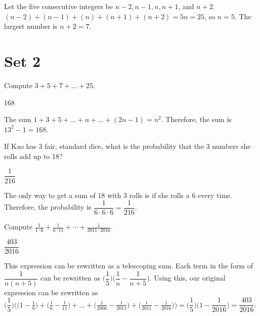 \documentclass[11pt]{article}
\begin{document}
\begin{solution}
Let the five consecutive integers be $n-2, n-1, n, n+1$, and $n+2$. $(n-2)+(n-1)+(n)+(n+1)+(n+2) = 5n = 25$, so $n=5$. The largest number is $n+2 = 7$.
\end{solution}

\newpage

\section*{Set 2}

\begin{problem}%
Compute $3+5+7+...+25$.
\end{problem}

\begin{answer}
168
\end{answer}

\begin{solution}
The sum $1+3+5+...+n+...+(2n-1) = n^2$. Therefore, the sum is $13^2-1 = 168$.  
\end{solution}


\begin{problem}%
If Kao has 3 fair, standard dice, what is the probability that the 3 numbers she rolls add up to 18?
\end{problem}

\begin{answer}
$\dfrac{1}{216}$
\end{answer}

\begin{solution}
The only way to get a sum of 18 with 3 rolls is if she rolls a 6 every time. Therefore, the probability is $\dfrac{1}{6\cdot6\cdot6} = \dfrac{1}{216}$.
\end{solution}

\begin{problem}%
Compute $\frac{1}{1\cdot 6} + \frac{1}{6\cdot 11} + \cdots + \frac{1}{2011\cdot 2016}$.
\end{problem}

\begin{answer}
$\dfrac{403}{2016}$
\end{answer}

\begin{solution}
This expression can be rewritten as a telescoping sum. Each term in the form of $\dfrac{1}{n(n+5)}$ can be rewritten as $\bigg(\dfrac{1}{5}\bigg)\bigg(\dfrac{1}{n}-\dfrac{1}{n+5}\bigg)$. Using this, our original expression can be rewritten as $\bigg(\dfrac{1}{5}\bigg)\bigg(\big(1-\frac{1}{6}\big)+\big(\frac{1}{6}-\frac{1}{11}\big)+...+\big(\frac{1}{2006}-\frac{1}{2011}\big)+\big(\frac{1}{2011}-\frac{1}{2016}\big)\bigg) = \bigg(\dfrac{1}{5}\bigg)\bigg(1-\dfrac{1}{2016}\bigg) = \dfrac{403}{2016}$.
\end{solution}
\end{document}
